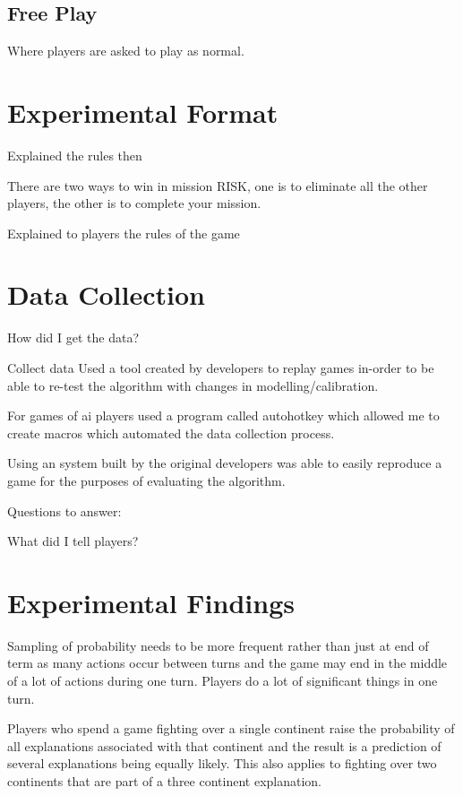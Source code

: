\documentclass[parskip]{cs4rep}
\begin{document}
\subsection{Free Play}

Where players are asked to play as normal.

\section{Experimental Format}

Explained the rules then

There are two ways to win in mission RISK, one is to eliminate all the other players, the other is to complete your mission.

Explained to players the rules of the game 

\section{Data Collection}

How did I get the data?

Collect data
Used a tool created by developers to replay games in-order to be able to re-test the algorithm with changes in modelling/calibration.

For games of ai players used a program called autohotkey which allowed me to create macros which automated the data collection process.

Using an system built by the original developers was able to easily reproduce a game for the purposes of evaluating the algorithm.

Questions to answer:


What did I tell players?

\section{Experimental Findings}

Sampling of probability needs to be more frequent rather than just at end of term as many actions occur between turns and the game may end in the middle of a lot of actions during one turn. Players do a lot of significant things in one turn.

Players who spend a game fighting over a single continent raise the probability of all explanations associated with that continent and the result is a prediction of several explanations being equally likely. This also applies to fighting over two continents that are part of a three continent explanation.
\end{document}
